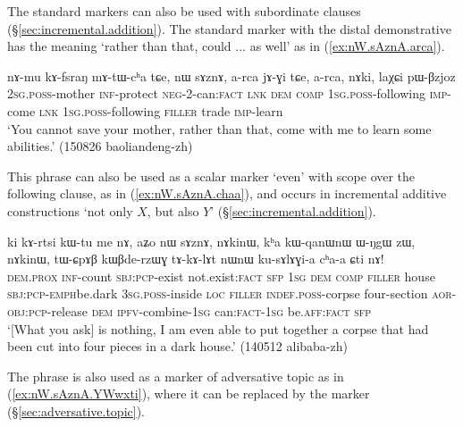  The standard markers can also be used with subordinate clauses (§\ref{sec:incremental.addition}). The standard marker with the distal demonstrative  has the meaning `rather than that, could ... as well' as in (\ref{ex:nW.sAznA.arca}).  
 
 \begin{exe}
 \ex \label{ex:nW.sAznA.arca}
 \gll  nɤ-mu kɤ-fsraŋ mɤ-tɯ-cʰa tɕe, nɯ sɤznɤ, a-rca jɤ-ɣi tɕe, a-rca, nɤki, laχɕi pɯ-βzjoz \\
 \textsc{2sg}.\textsc{poss}-mother \textsc{inf}-protect \textsc{neg}-2-can:\textsc{fact} \textsc{lnk} \textsc{dem} \textsc{comp} \textsc{1sg}.\textsc{poss}-following \textsc{imp}-come \textsc{lnk} \textsc{1sg}.\textsc{poss}-following \textsc{filler} trade \textsc{imp}-learn \\
\glt `You cannot save your mother, rather than that, come with me to learn  some abilities.' (150826 baoliandeng-zh)
\end{exe}

This phrase can also be used as a scalar marker `even' with scope over the following clause, as in (\ref{ex:nW.sAznA.chaa}), and occurs in incremental additive constructions `not only $X$, but also $Y$' (§\ref{sec:incremental.addition}).
 

 \begin{exe}
 \ex \label{ex:nW.sAznA.chaa}
 \gll ki kɤ-rtsi kɯ-tu me nɤ, aʑo nɯ sɤznɤ, nɤkinɯ, kʰa kɯ-qanɯ\redp{}nɯ ɯ-ŋgɯ zɯ, nɤkinɯ, tɯ-ɕpɤβ kɯβde-rzɯɣ tɤ-kɤ-lɤt nɯnɯ ku-sɤlɤɣi-a cʰa-a ɕti nɤ! \\
 \textsc{dem}.\textsc{prox} \textsc{inf}-count \textsc{sbj}:\textsc{pcp}-exist not.exist:\textsc{fact} \textsc{sfp} \textsc{1sg} \textsc{dem} \textsc{comp} \textsc{filler} house   \textsc{sbj}:\textsc{pcp}-\textsc{emph}\redp{}be.dark \textsc{3sg}.\textsc{poss}-inside \textsc{loc}  \textsc{filler} \textsc{indef}.\textsc{poss}-corpse four-section \textsc{aor}-\textsc{obj}:\textsc{pcp}-release \textsc{dem} \textsc{ipfv}-combine-\textsc{1sg} can:\textsc{fact}-\textsc{1sg} be.\textsc{aff}:\textsc{fact} \textsc{sfp}  \\
\glt  `[What you ask] is nothing, I am even able to put together a corpse that had been cut into four pieces in a dark house.'  (140512 alibaba-zh)
\end{exe}

The phrase  is also used as a marker of adversative topic as in (\ref{ex:nW.sAznA.YWwxti}), where it can be replaced by the marker  (§\ref{sec:adversative.topic}).

